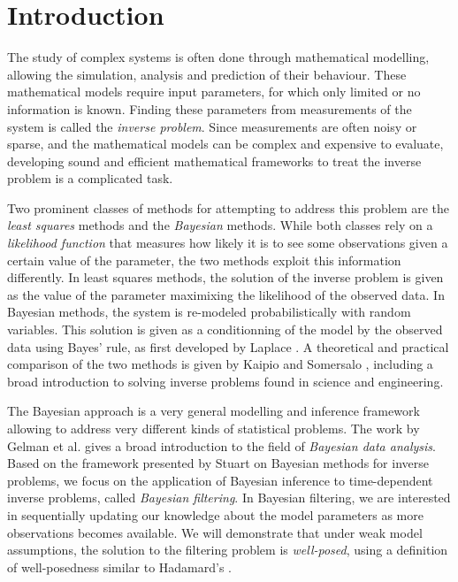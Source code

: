 \section{Introduction}
\setcounter{page}{1}
\thispagestyle{empty}

The study of complex systems is often done through mathematical modelling, allowing the simulation, analysis and prediction of their behaviour. These mathematical models require input parameters, for which only limited or no information is known. Finding these parameters from measurements of the system is called the \textit{inverse problem}. Since measurements are often noisy or sparse, and the mathematical models can be complex and expensive to evaluate, developing sound and efficient mathematical frameworks to treat the inverse problem is a complicated task.

Two prominent classes of methods for attempting to address this problem are the \textit{least squares} methods and the \textit{Bayesian} methods. While both classes rely on a \textit{likelihood function} that measures how likely it is to see some observations given a certain value of the parameter, the two methods exploit this information differently. In least squares methods, the solution of the inverse problem is given as the value of the parameter maximixing the likelihood of the observed data. In Bayesian methods, the system is re-modeled probabilistically with random variables. This solution is given as a conditionning of the model by the observed data using Bayes' rule, as first developed by Laplace \cite{laplace1820theorie}. A theoretical and practical comparison of the two methods is given by Kaipio and Somersalo \cite{kaipio2006statistical}, including a broad introduction to solving inverse problems found in science and engineering. 

The Bayesian approach is a very general modelling and inference framework allowing to address very different kinds of statistical problems. The work by Gelman et al. \cite[Chapter 1]{gelman} gives a broad introduction to the field of \textit{Bayesian data analysis}. Based on the framework presented by Stuart \cite{stuart_2010} on Bayesian methods for inverse problems, we focus on the application of Bayesian inference to time-dependent inverse problems, called \textit{Bayesian filtering}. In Bayesian filtering, we are interested in sequentially updating our knowledge about the model parameters as more observations becomes available. We will demonstrate that under weak model assumptions, the solution to the filtering problem is \textit{well-posed}, using a definition of well-posedness similar to Hadamard's \cite{hadamard}.

